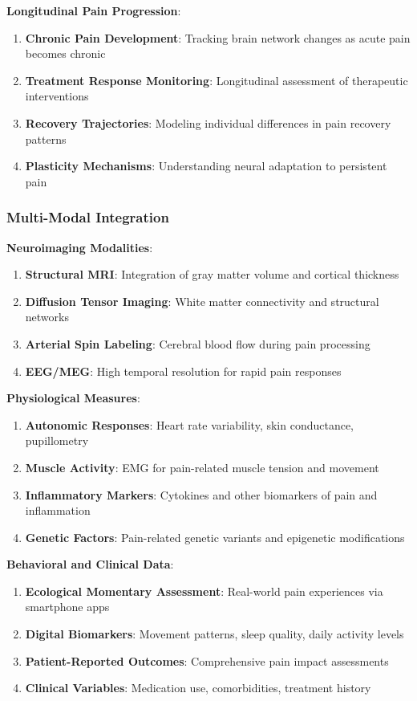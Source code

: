 \textbf{Longitudinal Pain Progression}:

\begin{enumerate}
\item \textbf{Chronic Pain Development}: Tracking brain network changes as acute pain becomes chronic
\item \textbf{Treatment Response Monitoring}: Longitudinal assessment of therapeutic interventions
\item \textbf{Recovery Trajectories}: Modeling individual differences in pain recovery patterns
\item \textbf{Plasticity Mechanisms}: Understanding neural adaptation to persistent pain
\end{enumerate}

\subsubsection{Multi-Modal Integration}

\textbf{Neuroimaging Modalities}:

\begin{enumerate}
\item \textbf{Structural MRI}: Integration of gray matter volume and cortical thickness
\item \textbf{Diffusion Tensor Imaging}: White matter connectivity and structural networks
\item \textbf{Arterial Spin Labeling}: Cerebral blood flow during pain processing
\item \textbf{EEG/MEG}: High temporal resolution for rapid pain responses
\end{enumerate}

\textbf{Physiological Measures}:

\begin{enumerate}
\item \textbf{Autonomic Responses}: Heart rate variability, skin conductance, pupillometry
\item \textbf{Muscle Activity}: EMG for pain-related muscle tension and movement
\item \textbf{Inflammatory Markers}: Cytokines and other biomarkers of pain and inflammation
\item \textbf{Genetic Factors}: Pain-related genetic variants and epigenetic modifications
\end{enumerate}

\textbf{Behavioral and Clinical Data}:

\begin{enumerate}
\item \textbf{Ecological Momentary Assessment}: Real-world pain experiences via smartphone apps
\item \textbf{Digital Biomarkers}: Movement patterns, sleep quality, daily activity levels
\item \textbf{Patient-Reported Outcomes}: Comprehensive pain impact assessments
\item \textbf{Clinical Variables}: Medication use, comorbidities, treatment history
\end{enumerate}

